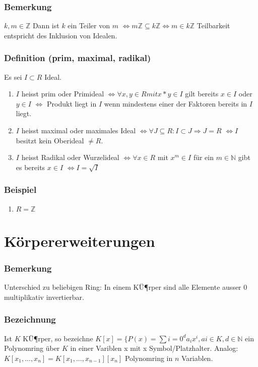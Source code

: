 \documentclass[12pt,a4paper,ngerman]{scrreprt}
\begin{document}
\subsection{Bemerkung}
$k,m \in \mathbb{Z}$ Dann ist $k$ ein Teiler von $m$ 
$\Leftrightarrow m\mathbb{Z} \subseteq k\mathbb{Z} \Leftrightarrow m \in k\mathbb{Z}$
Teilbarkeit entspricht des Inklusion von Idealen.

\subsection{Definition (prim, maximal, radikal)}
Es sei $I \subset R$ Ideal.
\begin{enumerate}[]
\item  $I$ heisst prim oder Primideal $\Leftrightarrow \forall x,y \in R mit x*y \in I$ gilt bereits $x \in I$ oder $y \in I$
$\Leftrightarrow$ Produkt liegt in $I$ wenn mindestens einer der Faktoren bereits in $I$ liegt.
\item $I$ heisst maximal oder maximales Ideal $\Leftrightarrow \forall J \subseteq R: I \subset J \Rightarrow J=R$
$\Leftrightarrow I$ besitzt kein Oberideal $\neq R$.
\item $I$ heisst Radikal oder Wurzelideal 
$\Leftrightarrow \forall x \in R$ mit $x^m \in I$ für ein 
$m \in \mathbb{N}$ gibt es bereits $x \in I$
$\Leftrightarrow I=\sqrt{I}$
\end{enumerate}

\subsection{Beispiel}
\begin{enumerate}[]
\item $R = \mathbb{Z}$
\end{enumerate}



\chapter{Körpererweiterungen}
\subsection{Bemerkung}

Unterschied zu beliebigen Ring: In einem KÜ¶rper sind alle Elemente ausser 0 multiplikativ invertierbar.

\subsection{Bezeichnung}
Ist $K$ KÜ¶rper, so bezeichne $K[x] = \{ P(x) = \sum{i=0}^d a_i x^i , ai \in K, d\in \mathbb{N}$
ein Polynomring über $K$ in einer Variblen x mit x Symbol/Platzhalter.
Analog: $K[x_1, ..., x_n] = K[x_1, ... , x_{n-1}][x_n]$ Polynomring in $n$ Variablen.
\end{document}
